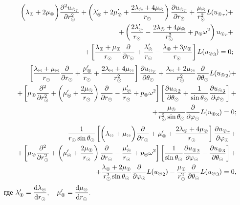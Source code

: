 \begin{equation}\label{eq_1.1}
\begin{split}
\biggl(\la\l+2\mu\l\biggr)\fr{\de^2 {u\l}_r}{\de r\s^2} + \left(\la\l'+2\mu\l'+\fr{2\la\l+4\mu\l}{r\s}\right)\fr{\de {u\l}_r}{\de r\s} + \fr{\mu\l}{r\s^2}L({u\l}_r) +\\
+ \left(\fr{2\la\l'}{r\s} - \fr{2\la\l+4\mu\l}{r\s^2} + p\l\om^2\right){u\l}_r +\\
+ \left[\fr{\la\l+\mu\l}{r\s}\fr{\de}{\de r\s} + \fr{\la\l'}{r\s} - \fr{\la\l+3\mu\l}{r\s}\right]L({u\l}_3) = 0;
\end{split}
\end{equation}
\begin{equation}\label{eq_2.1}
\begin{split}
\left[\fr{\la\l+\mu\l}{r\s}\fr{\de}{\de r\s}+\fr{\mu\l'}{r\s}+\fr{2\la\l+4\mu\l}{r\s^2}\right]\fr{\de{u\l}_r}{\de \Q\s} + \fr{\la\l+2\mu\l}{r\s^2}\fr{\de}{\de \Q\s}L({u\l}_2) + \\
+ \left[\mu\l\fr{\de^2}{\de r\s^2} + \left(\mu\l'+\fr{2\mu\l}{r\s}\right)\fr{\de}{\de r\s} - \fr{\mu\l'}{r\s} + p\l\om^2\right]\left[\fr{\de {u\l}_2}{\de\Q\s} + \fr{1}{\sin\Q\s}\fr{\de{u\l}_3}{\de\f\s}\right]+\\
+ \fr{\mu\l}{r\s^2\sin\Q\s}\fr{\de}{\de\f\s}L({u\l}_3) = 0;
\end{split}
\end{equation}
\begin{equation}\label{eq_3.1}
\begin{split}
\fr{1}{r\s\sin\Q\s}\left[\biggl(\la\l+\mu\l\biggr)\fr{\de}{\de r\s} + \mu\l' + \fr{2\la\l+4\mu\l}{r\s}\right]\fr{\de {u\l}_r}{\de\f\s} +\\
+ \left[\mu\l\fr{\de^2}{\de r\s^2} + \left(\mu\l'+\fr{2\mu\l}{r\s}\right)\fr{\de}{\de r\s} - \fr{\mu\l'}{r\s} + p\l\om^2\right]\left[\fr{1}{\sin\Q\s}\fr{\de {u\l}_2}{\de\f\s} - \fr{\de {u\l}_3}{\de\Q\s}\right] +\\
+ \fr{\la\l+2\mu\l}{r\s^2\sin\Q\s}\fr{\de}{\de \f\s}L({u\l}_2) -\fr{\mu\l}{r\s^2}\fr{\de}{\de\Q\s}L({u\l}_3) = 0,
\end{split}
\end{equation}
где $\la\l' = \df{\diff\la\l}{\diff r\s},\q\mu\l' = \df{\diff\mu\l}{\diff r\s}.$

